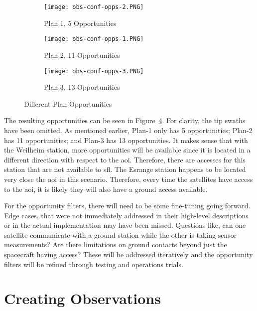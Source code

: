\begin{figure}
    \centering
    \begin{subfigure}[b]{0.75\textwidth}
	\centering
	\texttt{[image: obs-conf-opps-2.PNG]} 
	\caption{Plan 1, 5 Opportunities}
	\label{fig:obs-conf-opps-1}
    \end{subfigure}
    \hfill
    \begin{subfigure}[b]{0.75\textwidth}
	\centering
	\texttt{[image: obs-conf-opps-1.PNG]} 
	\caption{Plan 2, 11 Opportunities}
	\label{fig:obs-conf-opps-2} 
    \end{subfigure}
    \hfill
    \begin{subfigure}[b]{0.75\textwidth}
	\centering
	\texttt{[image: obs-conf-opps-3.PNG]} 
	\caption{Plan 3, 13 Opportunities}
	\label{fig:obs-conf-opps-3} 
    \end{subfigure}

    \caption{Different Plan Opportunities}
    \label{fig:obs-conf-opps}
\end{figure}


The resulting opportunities can be seen in Figure~\ref{fig:obs-conf-opps}.  For
clarity, the tip swaths have been omitted. As mentioned earlier, Plan-1 only
has 5 opportunities; Plan-2 has 11 opportunities; and Plan-3 has 13
opportunities. It makes sense that with the Weilheim station, more
opportunities will be available since it is located in a different direction
with respect to the \gls{aoi}. Therefore, there are accesses for this station
that are not available to \gls{sfl}. The Esrange station happens to be located
very close the \gls{aoi} in this scenario. Therefore, every time the satellites
have access to the \gls{aoi}, it is likely they will also have a ground access
available. 

For the opportunity filters, there will need to be some fine-tuning going
forward. Edge cases, that were not immediately addressed in their high-level
descriptions or in the actual implementation may have been missed. Questions
like, can one satellite communicate with a ground station while the other is
taking sensor measurements? Are there limitations on ground contacts beyond
just the spacecraft having access? These will be addressed iteratively and the
opportunity filters will be refined through testing and operations
trials.



\section{Creating Observations}

